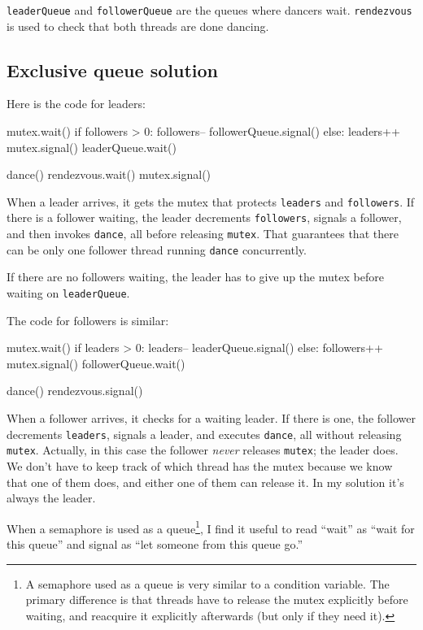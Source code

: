 \documentclass{book}
\begin{document}
    {\tt leaderQueue} and {\tt followerQueue} are the queues where
dancers wait.  {\tt rendezvous} is used to check that both threads
are done dancing.




\subsection {Exclusive queue solution}

Here is the code for leaders:

\begin{unbreakable}[title={Queue solution (leaders)}]{}
mutex.wait()
if followers > 0:
    followers--
    followerQueue.signal()
else:
    leaders++
    mutex.signal()
    leaderQueue.wait()    

dance()
rendezvous.wait()
mutex.signal()
\end{unbreakable}

When a leader arrives, it gets the mutex that protects {\tt leaders}
and {\tt followers}.  If there is a follower waiting, the leader
decrements {\tt followers}, signals a follower, and then invokes
    {\tt dance}, all before releasing {\tt mutex}.  That guarantees that
there can be only one follower thread running {\tt dance}
concurrently.

If there are no followers waiting, the leader has to give up the mutex
before waiting on {\tt leaderQueue}.

The code for followers is similar:


\begin{unbreakable}[title={Queue solution (followers)}]{}
mutex.wait()
if leaders > 0:
    leaders--
    leaderQueue.signal()
else:
    followers++
    mutex.signal()
    followerQueue.wait()    

dance()
rendezvous.signal()
\end{unbreakable}

When a follower arrives, it checks for a waiting leader.  If there
is one, the follower decrements {\tt leaders}, signals a leader, and
executes {\tt dance}, all without releasing {\tt mutex}.  Actually,
in this case the follower {\em never} releases {\tt mutex};
the leader does.  We don't have to keep track of which thread has the
mutex because we know that one of them does, and either one of them can
release it.  In my solution it's always the leader.

When a semaphore is used as a queue\footnote{A semaphore used as a
    queue is very similar to a condition variable.  The primary difference
    is that threads have to release the mutex explicitly before waiting,
    and reacquire it explicitly afterwards (but only if they need it).},
I find it useful to read ``wait'' as ``wait for this queue'' and
signal as ``let someone from this queue go.''
\end{document}
